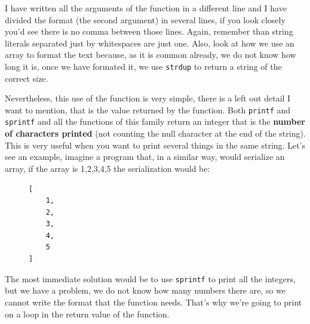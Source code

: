 \documentclass[a4paper]{article}
\begin{document}
I have written all the arguments of the function in a different line and I have
divided the format (the second argument) in several lines, if you look closely
you'd see there is no comma between those lines. Again, remember than string
literals separated just by whitespaces are just one. Also, look at how we use
an array to format the text because, as it is common already, we do not know
how long it is, once we have formated it, we use \verb"strdup" to return a
string of the correct size.

Nevertheless, this use of the function is very simple, there is a left out
detail I want to mention, that is the value returned by the function. Both
\verb!printf! and \verb!sprintf! and all the functions of this family return an
integer that is the \textbf{number of characters printed} (not counting the
null character at the end of the string). This is very useful when you want to
print several things in the same string. Let's see an example, imagine a
program that, in a similar way, would serialize an array, if the array is
{1,2,3,4,5} the serialization would be:

\begin{figure}[H]
\begin{verbatim}
[
    1,
    2,
    3,
    4,
    5
]
\end{verbatim}
\end{figure}
The most immediate solution would be to use \verb!sprintf! to print all the
integers, but we have a problem, we do not know how many numbers there are,
so we cannot write the format that the function needs. That's why we're going
to print on a loop in the return value of the function.
\end{document}
